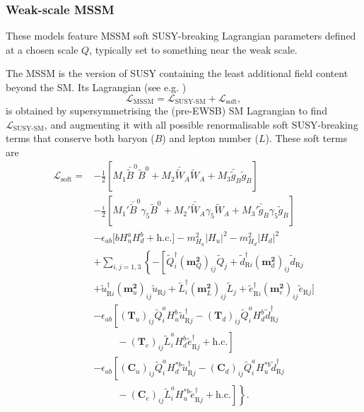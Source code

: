 \documentclass[pdftex,twocolumn,epjc3_preprint,runningheads]{svjour3}
\renewcommand{\_}{\discretionary{\underscore}{}{\underscore}}
\begin{document}
\subsubsection{Weak-scale MSSM}

These models feature MSSM soft SUSY-breaking Lagrangian parameters defined at a chosen scale $Q$, typically set to something near the weak scale.

The MSSM is the version of SUSY containing the least additional field content beyond the SM.  Its Lagrangian (see e.g. \cite{BaerTata})
\begin{equation}
\mathcal{L}_\mathrm{MSSM} = \mathcal{L}_\textrm{SUSY-SM} + \mathcal{L}_\mathrm{soft},
\label{lmssm}
\end{equation}
is obtained by supersymmetrising the (pre-EWSB) SM Lagrangian to find $\mathcal{L}_\textrm{SUSY-SM}$, and augmenting it with all possible renormalisable soft SUSY-breaking terms that conserve both baryon ($B$) and lepton number ($L$).  These soft terms are
\begin{subequations}
\label{lsoft}
\begin{align}
\mathcal{L}_\mathrm{soft} =& -\frac12\left[M_1\bar{\tilde{B}}^0\tilde{B}^0 + M_2\bar{\tilde{W}}_A\tilde{W}_A + M_3\bar{\tilde{g}}_B\tilde{g}_B\right] \label{gauginos} \\
&  -\frac{i}{2}\left[M_1'\bar{\tilde{B}}^0\gamma_5\tilde{B}^0 + M_2'\bar{\tilde{W}}_A\gamma_5\tilde{W}_A + M_3'\bar{\tilde{g}}_B\gamma_5\tilde{g}_B\right] \label{CP-violating gauginos} \\
&  - \epsilon_{ab}\Big[b{H}^a_u{H}^b_d + \mathrm{h.c.}\Big] - m^2_{H_u}|H_u|^2 - m^2_{H_d}|H_d|^2 \label{Higgses} \\
&  +\textstyle\sum_{i,j=1,3} \left\{ -\left[\tilde{Q}_i^\dagger(\mathbf{m}^\mathbf{2}_Q)_{ij}\tilde{Q}_j +
\tilde{d}_{\mathrm{R}i}^\dagger(\mathbf{m}^\mathbf{2}_d)_{ij}\tilde{d}_{\mathrm{R}j} \right. \right. \nonumber \\
&  + \tilde{u}_{\mathrm{R}i}^\dagger(\mathbf{m}^\mathbf{2}_u)_{ij}\tilde{u}_{\mathrm{R}j}
   + \tilde{L}_{i}^\dagger(\mathbf{m}^\mathbf{2}_L)_{ij}\tilde{L}_{j}
   + \tilde{e}_{\mathrm{R}i}^\dagger(\mathbf{m}^\mathbf{2}_e)_{ij}\tilde{e}_{\mathrm{R}j} \Big] \label{sfermion masses} \\
 & - \epsilon_{ab}\left[(\mathbf{T}_u)_{ij}\tilde{Q}^a_iH^b_u\tilde{u}^\dagger_{\mathrm{R}j}
   - (\mathbf{T}_d)_{ij}\tilde{Q}^a_iH^b_d\tilde{d}^\dagger_{\mathrm{R}j} \right. \nonumber\\
&  \hspace{1cm} - \left. (\mathbf{T}_e)_{ij}\tilde{L}^a_iH^b_d\tilde{e}^\dagger_{\mathrm{R}j} + \mathrm{h.c.}\right] \label{trilinear couplings} \\
&  - \epsilon_{ab}\left[(\mathbf{C}_u)_{ij}\tilde{Q}^a_iH^{*b}_d\tilde{u}^\dagger_{\mathrm{R}j}
   - (\mathbf{C}_d)_{ij}\tilde{Q}^a_iH^{*b}_u\tilde{d}^\dagger_{\mathrm{R}j} \right. \nonumber \\
&  \hspace{1cm} - \left.\left. (\mathbf{C}_e)_{ij}\tilde{L}^a_iH^{*b}_u\tilde{e}^\dagger_{\mathrm{R}j} + \mathrm{h.c.}\right] \right\}. \label{trilinear C couplings}
\end{align}
\end{subequations}
\end{document}
